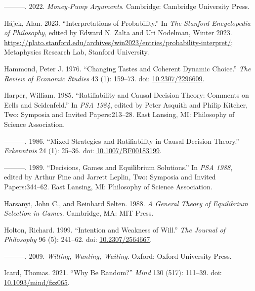 \documentclass[
  10pt,
  letterpaper,
  DIV=11,
  numbers=noendperiod,
  twoside]{scrartcl}
\newlength{\cslhangindent}
\newenvironment{CSLReferences}[2] %
 {\begin{list}{}{%
  \setlength{\itemindent}{0pt}
  \setlength{\leftmargin}{0pt}
  \setlength{\parsep}{0pt}
  \ifodd #1
   \setlength{\leftmargin}{\cslhangindent}
   \setlength{\itemindent}{-1\cslhangindent}
  \fi
  \setlength{\itemsep}{#2\baselineskip}}}
 {\end{list}}
\begin{document}
\begin{CSLReferences}{1}{0}
---------. 2022. \emph{Money-Pump Arguments}. Cambridge: Cambridge
University Press.

Hájek, Alan. 2023. {``{Interpretations of Probability}.''} In \emph{The
{Stanford} Encyclopedia of Philosophy}, edited by Edward N. Zalta and
Uri Nodelman, {W}inter 2023.
\url{https://plato.stanford.edu/archives/win2023/entries/probability-interpret/};
Metaphysics Research Lab, Stanford University.

Hammond, Peter J. 1976. {``Changing Tastes and Coherent Dynamic
Choice.''} \emph{The Review of Economic Studies} 43 (1): 159--73. doi:
\href{https://doi.org/10.2307/2296609}{10.2307/2296609}.

Harper, William. 1985. {``Ratifiability and Causal Decision Theory:
Comments on Eells and Seidenfeld.''} In \emph{PSA 1984}, edited by Peter
Asquith and Philip Kitcher, Two: Symposia and Invited Papers:213--28.
East Lansing, MI: Philosophy of Science Association.

---------. 1986. {``Mixed Strategies and Ratifiability in Causal
Decision Theory.''} \emph{Erkenntnis} 24 (1): 25--36. doi:
\href{https://doi.org/10.1007/BF00183199}{10.1007/BF00183199}.

---------. 1989. {``Decisions, Games and Equilibrium Solutions.''} In
\emph{PSA 1988}, edited by Arthur Fine and Jarrett Leplin, Two: Symposia
and Invited Papers:344--62. East Lansing, MI: Philosophy of Science
Association.

Harsanyi, John C., and Reinhard Selten. 1988. \emph{A General Theory of
Equilibrium Selection in Games}. Cambridge, MA: {MIT} Press.

Holton, Richard. 1999. {``Intention and Weakness of Will.''} \emph{The
Journal of Philosophy} 96 (5): 241--62. doi:
\href{https://doi.org/10.2307/2564667}{10.2307/2564667}.

---------. 2009. \emph{Willing, Wanting, Waiting}. Oxford: Oxford
University Press.

Icard, Thomas. 2021. {``Why Be Random?''} \emph{Mind} 130 (517):
111--39. doi:
\href{https://doi.org/10.1093/mind/fzz065}{10.1093/mind/fzz065}.


\end{CSLReferences}
\end{document}
